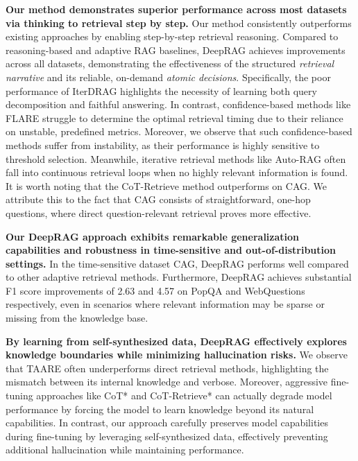 \textbf{Our method demonstrates superior performance across most datasets via thinking to retrieval step by step.} 
Our method consistently outperforms existing approaches by enabling step-by-step retrieval reasoning.
Compared to reasoning-based and adaptive RAG baselines, DeepRAG achieves improvements across all datasets, demonstrating the effectiveness of the structured \textit{retrieval narrative} and its reliable, on-demand  \textit{atomic decisions}.
% 
Specifically, the poor performance of IterDRAG highlights the necessity of learning both query decomposition and faithful answering.
In contrast, confidence-based methods like FLARE struggle to determine the optimal retrieval timing due to their reliance on unstable, predefined metrics. 
Moreover, we observe that such confidence-based methods suffer from instability, as their performance is highly sensitive to threshold selection. 
Meanwhile, iterative retrieval methods like Auto-RAG often fall into continuous retrieval loops when no highly relevant information is found.
% 
It is worth noting that the CoT-Retrieve method outperforms on CAG. We attribute this to the fact that CAG consists of straightforward, one-hop questions, where direct question-relevant retrieval proves more effective.

\textbf{Our DeepRAG approach exhibits remarkable generalization capabilities and robustness in time-sensitive and out-of-distribution settings.}
In the time-sensitive dataset CAG, DeepRAG performs well compared to other adaptive retrieval methods. 
Furthermore, DeepRAG achieves substantial F1 score improvements of 2.63 and 4.57 on PopQA and WebQuestions respectively, even in scenarios where relevant information may be sparse or missing from the knowledge base.

\textbf{By learning from self-synthesized data, DeepRAG effectively explores knowledge boundaries while minimizing hallucination risks.} 
We observe that TAARE often underperforms direct retrieval methods, highlighting the mismatch between its internal knowledge and verbose.
Moreover, aggressive fine-tuning approaches like CoT* and CoT-Retrieve* can actually degrade model performance by forcing the model to learn knowledge beyond its natural capabilities.
In contrast, our approach carefully preserves model capabilities during fine-tuning by leveraging self-synthesized data, effectively preventing additional hallucination while maintaining performance.


